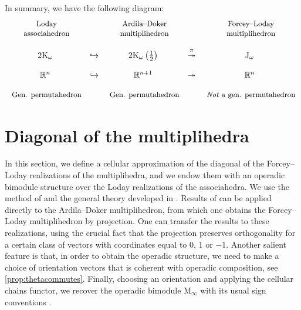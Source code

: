 \documentclass[twoside, 12pt]{amsart}
\theoremstyle{remark}
\newcommand{\RR}{\mathbb{R}}
\newcommand{\K}{\mathrm{K}}
\newcommand{\J}{\mathrm{J}}
\newcommand{\Minf}{\mathrm{M}_\infty} %
\begin{document}
In summary, we have the following diagram:
\medskip
\begin{equation*}
\begin{matrix}
  $ \small  \text{Loday}$ & & $ \small \text{Ardila--Doker}$ &  & $ \small \text{Forcey--Loday}$ \\
  $ \small  \text{associahedron}$ & & $ \small \text{multiplihedron}$ &  & $ \small \text{multiplihedron}$ \\
  & &  &  & \\
  2\K_\omega & \hookrightarrow & 2\K_\omega \left(\tfrac{1}{2}\right) & \overset{\pi}{\twoheadrightarrow} & \J_\omega \\
   & &  &  & \\
  \RR^n & \hookrightarrow & \RR^{n+1} & \twoheadrightarrow & \RR^n \\
  & &  &  & \\
  $ \small \text{Gen. permutahedron}$ & & $ \small \text{Gen. permutahedron}$ &  & $ \small \textit{Not}\text{ a gen. permutahedron}$
\end{matrix}
\end{equation*}


\section{Diagonal of the multiplihedra}
\label{sec:II}

In this section, we define a cellular approximation of the diagonal of the Forcey--Loday realizations of the multiplihedra, and we endow them with an operadic bimodule structure over the Loday realizations of the associahedra. 
We use the method of \cite{MTTV19} and the general theory developed in \cite{LA21}.
Results of \cite{LA21} can be applied directly to the Ardila--Doker multiplihedron, from which one obtains the Forcey--Loday multiplihedron by projection. 
One can transfer the results to these realizations, using the crucial fact that the projection preserves orthogonality for a certain class of vectors with coordinates equal to $0$, $1$ or $-1$. 
Another salient feature is that, in order to obtain the operadic structure, we need to make a choice of orientation vectors that is coherent with operadic composition, see \cref{prop:thetacommutes}. 
Finally, choosing an orientation and applying the cellular chains functor, we recover the operadic bimodule $\Minf$ with its usual sign conventions \cite{Mazuir21}.

 
\end{document}
